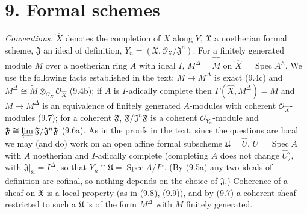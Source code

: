 \documentclass[11pt]{article}
\begin{document}
\section*{9. Formal schemes}

\noindent\emph{Conventions.} $\widehat X$ denotes the completion of $X$ along $Y$, $\mathfrak X$ a noetherian formal scheme, $\mathfrak J$ an ideal of definition, $Y_n=(\mathfrak X,\mathcal O_{\mathfrak X}/\mathfrak J^n)$. For a finitely generated module $M$ over a noetherian ring $A$ with ideal $I$, $M^\Delta=\widehat{\widetilde M}$ on $\widehat X=\operatorname{Spec}A^{\wedge}$. We use the following facts established in the text: $M\mapsto M^\Delta$ is exact (9.4c) and $M^\Delta\cong\widetilde M\otimes_{\mathcal O_X}\mathcal O_{\widehat X}$ (9.4b); if $A$ is $I$-adically complete then $\Gamma(\widehat X,M^\Delta)=M$ and $M\mapsto M^\Delta$ is an equivalence of finitely generated $A$-modules with coherent $\mathcal O_{\widehat X}$-modules (9.7); for a coherent $\mathfrak F$, $\mathfrak F/\mathfrak J^n\mathfrak F$ is a coherent $\mathcal O_{Y_n}$-module and $\mathfrak F\cong\varprojlim\mathfrak F/\mathfrak J^n\mathfrak F$ (9.6a). As in the proofs in the text, since the questions are local we may (and do) work on an open affine formal subscheme $\mathfrak U=\widehat U$, $U=\operatorname{Spec}A$ with $A$ noetherian and $I$-adically complete (completing $A$ does not change $\widehat U$), with $\mathfrak J|_{\mathfrak U}=I^\Delta$, so that $Y_n\cap\mathfrak U=\operatorname{Spec}A/I^n$. (By (9.5a) any two ideals of definition are cofinal, so nothing depends on the choice of $\mathfrak J$.) Coherence of a sheaf on $\mathfrak X$ is a local property (as in (9.8), (9.9)), and by (9.7) a coherent sheaf restricted to such a $\mathfrak U$ is of the form $M^\Delta$ with $M$ finitely generated.
\end{document}
